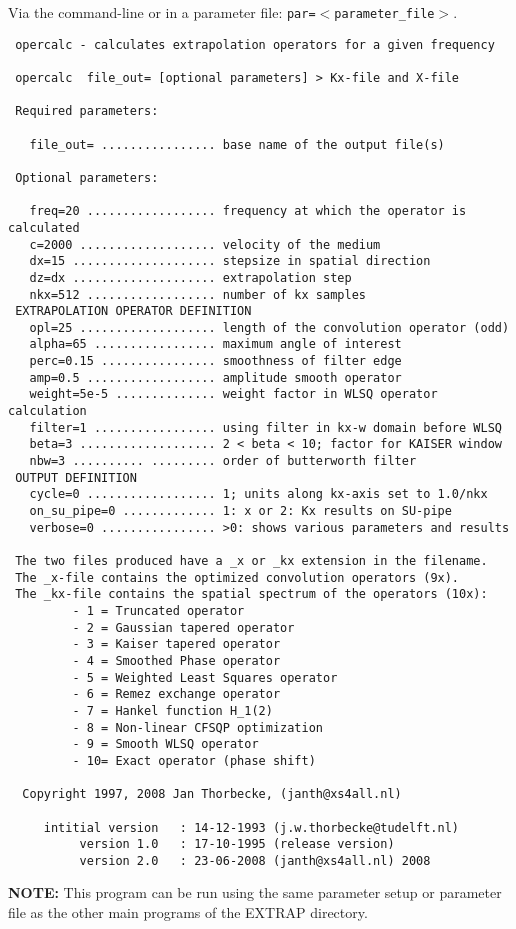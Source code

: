 Via the command-line or in a parameter file: {\tt par=$<$parameter\_file$>$}.
{\footnotesize
\begin{verbatim}
 opercalc - calculates extrapolation operators for a given frequency
 
 opercalc  file_out= [optional parameters] > Kx-file and X-file
 
 Required parameters:
 
   file_out= ................ base name of the output file(s)
 
 Optional parameters:
 
   freq=20 .................. frequency at which the operator is calculated
   c=2000 ................... velocity of the medium
   dx=15 .................... stepsize in spatial direction
   dz=dx .................... extrapolation step
   nkx=512 .................. number of kx samples
 EXTRAPOLATION OPERATOR DEFINITION 
   opl=25 ................... length of the convolution operator (odd)
   alpha=65 ................. maximum angle of interest
   perc=0.15 ................ smoothness of filter edge
   amp=0.5 .................. amplitude smooth operator
   weight=5e-5 .............. weight factor in WLSQ operator calculation
   filter=1 ................. using filter in kx-w domain before WLSQ
   beta=3 ................... 2 < beta < 10; factor for KAISER window
   nbw=3 .......... ......... order of butterworth filter
 OUTPUT DEFINITION 
   cycle=0 .................. 1; units along kx-axis set to 1.0/nkx
   on_su_pipe=0 ............. 1: x or 2: Kx results on SU-pipe
   verbose=0 ................ >0: shows various parameters and results
 
 The two files produced have a _x or _kx extension in the filename.
 The _x-file contains the optimized convolution operators (9x). 
 The _kx-file contains the spatial spectrum of the operators (10x):
         - 1 = Truncated operator
         - 2 = Gaussian tapered operator
         - 3 = Kaiser tapered operator
         - 4 = Smoothed Phase operator
         - 5 = Weighted Least Squares operator
         - 6 = Remez exchange operator
         - 7 = Hankel function H_1(2)
         - 8 = Non-linear CFSQP optimization
         - 9 = Smooth WLSQ operator
         - 10= Exact operator (phase shift)
 
  Copyright 1997, 2008 Jan Thorbecke, (janth@xs4all.nl) 
 
     intitial version   : 14-12-1993 (j.w.thorbecke@tudelft.nl)
          version 1.0   : 17-10-1995 (release version)
          version 2.0   : 23-06-2008 (janth@xs4all.nl) 2008
\end{verbatim}}
\noindent
{\bf NOTE:} This program can be run using the same parameter setup or parameter file as the other main programs of the EXTRAP directory.

